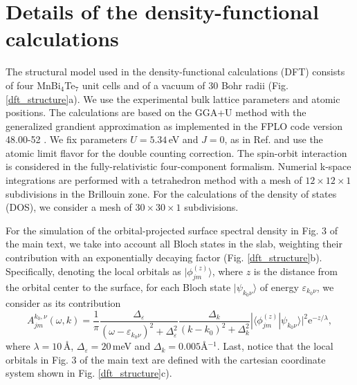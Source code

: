 \documentclass[showpacs, preprintnumbers, pra, superscriptaddress, floatfix, onecolumn, longbibliography]{revtex4-1}
\begin{document}
\title{}


\maketitle

\section{Details of the density-functional calculations}

The structural model used in the density-functional calculations (DFT) consists of four MnBi$_4$Te$_7$ unit cells and of a vacuum of 30 Bohr radii (Fig. \ref{dft_structure}a). We use the experimental bulk lattice parameters and atomic positions.
The calculations are based on the GGA+U method with the generalized grandient approximation \cite{perdew1996generalized} as implemented in the FPLO code version 48.00-52 \cite{PhysRevB.59.1743}. We fix parameters $U=5.34\,$eV and $J=0$, as in Ref. \cite{otrokov2019prediction} and use the atomic limit flavor for the double counting correction. The spin-orbit interaction is considered in the fully-relativistic four-component formalism. Numerial k-space integrations are performed with a tetrahedron method with a mesh of $12\times12\times1$ subdivisions in the Brillouin zone. For the calculations of the density of states (DOS), we consider a mesh of $30\times30\times1$ subdivisions.

For the simulation of the orbital-projected surface spectral density in Fig. 3 of the main text, we take into account all Bloch states in the slab, weighting their contribution with an exponentially decaying factor (Fig. \ref{dft_structure}b). Specifically, denoting the local orbitals as $|\phi^{(z)}_{jm}\rangle$, where $z$ is the distance from the orbital center to the surface, for each Bloch state $|\psi_{k_0\nu}\rangle$ of energy $\varepsilon_{k_0\nu}$, we consider as its contribution 
\begin{equation}
A^{k_0,\nu}_{jm}(\omega,k)=\frac{1}{\pi}\frac{ \Delta_\varepsilon}{(\omega-\varepsilon_{k_0\nu})^2 + \Delta^2_\varepsilon}\frac{ \Delta_k}{(k-k_0)^2 + \Delta^2_k }|\langle \phi^{(z)}_{jm} | \psi_{k_0\nu} \rangle|^2 \text{e}^{-z/\lambda},
\end{equation}
where $\lambda=10\,$\AA, $\Delta_\varepsilon=20\,$meV and $\Delta_k=0.005$\AA$^{-1}$. Last, notice that the local orbitals in Fig. 3 of the main text are defined with the cartesian coordinate system shown in Fig. \ref{dft_structure}c).
\end{document}
